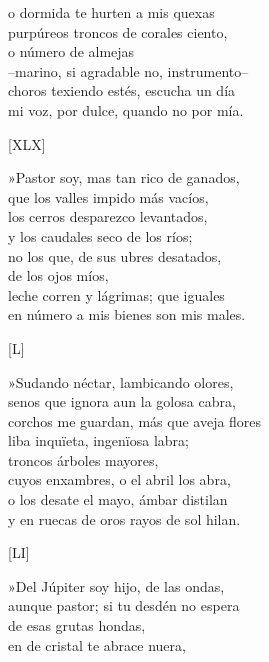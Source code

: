 \documentclass[11pt,a4paper,twoside]{article}
\begin{document}
o dormida te hurten a mis quexas\\
purpúreos troncos de corales ciento,\\
o  número de almejas\\
--marino, si agradable no, instrumento--\\
choros texiendo estés, escucha un día\\
mi voz, por dulce, quando no por mía.\par\pend
%
\begin{center}
	[XLX]
\end{center}\pstart
»Pastor soy, mas tan rico de ganados,\\
que los valles impido más vacíos,\\
los cerros desparezco levantados,\\
y los caudales seco de los ríos;\\
no los que, de sus ubres desatados,\\
 de los ojos míos,\\
leche corren y lágrimas; que iguales\\
en número a mis bienes son mis males.\par\pend
%
\begin{center}
	[L]
\end{center}\pstart
»Sudando néctar, lambicando olores,\\
senos que ignora aun la golosa cabra,\\
corchos me guardan, más que aveja flores\\
liba inquïeta, ingenïosa labra;\\
troncos  árboles mayores,\\
cuyos enxambres, o el abril los abra,\\
o los desate el mayo, ámbar distilan\\
y en ruecas de oros rayos de sol hilan.\par\pend
%
\begin{center}
	[LI]
\end{center}\pstart
»Del Júpiter soy hijo, de las ondas,\\
aunque pastor; si tu desdén no espera\\
 de esas grutas hondas,\\
en  de cristal te abrace nuera,\\
\end{document}
